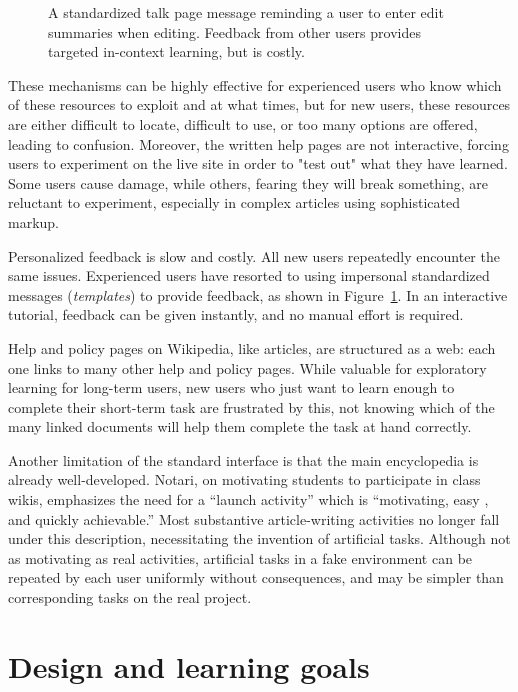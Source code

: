 \documentclass{acm_proc_article-sp}
\begin{document}
\begin{figure}
\centering
{}
\caption{A standardized talk page message reminding a user to enter edit summaries when editing. Feedback from other users provides targeted in-context learning, but is costly.}
\label{fig:talktemplate}
\end{figure}

These mechanisms can be highly effective for experienced users who know which of these resources to exploit and at what times, but for new users, these resources are either difficult to locate, difficult to use, or too many options are offered, leading to confusion. Moreover, the written help pages are not interactive, forcing users to experiment on the live site in order to "test out" what they have learned. Some users cause damage, while others, fearing they will break something, are reluctant to experiment, especially in complex articles using sophisticated markup.

Personalized feedback is slow and costly. All new users repeatedly encounter the same issues. Experienced users have resorted to using impersonal standardized messages (\emph{templates}) to provide feedback, as shown in Figure~\ref{fig:talktemplate}. In an interactive tutorial, feedback can be given instantly, and no manual effort is required.

Help and policy pages on Wikipedia, like articles, are structured as a web: each one links to many other help and policy pages. While valuable for exploratory learning for long-term users, new users who just want to learn enough to complete their short-term task are frustrated by this, not knowing which of the many linked documents will help them complete the task at hand correctly.

Another limitation of the standard interface is that the main encyclopedia is already well-developed. Notari,\cite{Notari:2006} on motivating students to participate in class wikis, emphasizes the need for a ``launch activity'' which is ``motivating, easy , and quickly achievable.'' Most substantive article-writing activities no longer fall under this description, necessitating the invention of artificial tasks. Although not as motivating as real activities, artificial tasks in a fake environment can be repeated by each user uniformly without consequences, and may be simpler than corresponding tasks on the real project.

\section{Design and learning goals}
\end{document}
